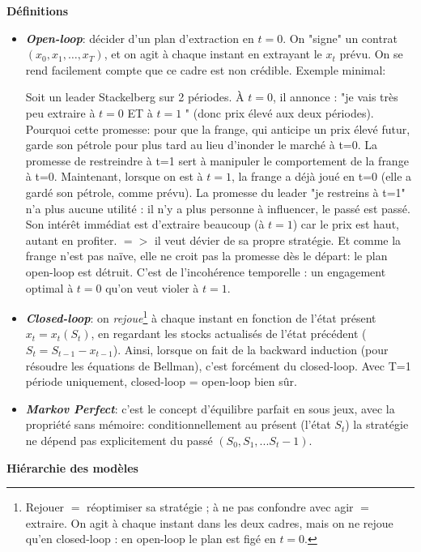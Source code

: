 \documentclass[11pt]{article}
\begin{document}
\textbf{Définitions} 


\begin{itemize}
    \item \textit{\textbf{Open-loop}}: décider d'un plan d'extraction en $t=0$. On "signe" un contrat $(x_0, x_1, …, x_T)$, et on agit à chaque instant en extrayant le $x_t$ prévu. On se rend facilement compte que ce cadre est non crédible. Exemple minimal: 

     Soit un leader Stackelberg sur 2 périodes. À $t=0$, il annonce : "je vais très peu extraire à $t=0$ ET à $t=1$ " (donc prix élevé aux deux périodes). Pourquoi cette promesse:  pour que la frange, qui anticipe un prix élevé futur, garde son pétrole pour plus tard au lieu d'inonder le marché à t=0. La promesse de restreindre à t=1 sert à manipuler le comportement de la frange à t=0. Maintenant, lorsque on est à $t=1$, la frange a déjà joué en t=0 (elle a gardé son pétrole, comme prévu). La promesse du leader  "je restreins à t=1" n'a plus aucune utilité : il n'y a plus personne à influencer, le passé est passé. Son intérêt immédiat est d'extraire beaucoup (à $t=1$) car le prix est haut, autant en profiter. $=>$ il veut dévier de sa propre stratégie. Et comme la frange n'est pas naïve, elle ne croit pas la promesse dès le départ: le plan open-loop est détruit. C'est de l'incohérence temporelle : un engagement optimal à $t=0$ qu'on veut violer à $t=1$. 
     
    \item \textbf{\textit{Closed-loop}}: on \textit{rejoue}\footnote{Rejouer $=$ réoptimiser sa stratégie ; à ne pas confondre avec agir $=$ extraire. On agit à chaque instant dans les deux cadres, mais on ne rejoue qu'en closed-loop : en open-loop le plan est figé en $t=0$.} à chaque instant en fonction de l'état présent $x_t=x_t(S_t)$, en regardant les stocks actualisés de l'état précédent ($S_t=S_{t-1}-x_{t-1}$). Ainsi, lorsque on fait de la backward induction (pour résoudre les équations de Bellman), c'est forcément du closed-loop. 
    Avec T=1 période uniquement, closed-loop = open-loop bien sûr.
    \item \textbf{\textit{Markov Perfect}}: c'est le concept d'équilibre parfait en sous jeux, avec la propriété sans mémoire: conditionnellement au présent (l'état $S_t$) la stratégie ne dépend pas explicitement du passé $(S_0,S_1,...S_t-1)$.
\end{itemize}


\textbf{Hiérarchie des modèles}
\end{document}
